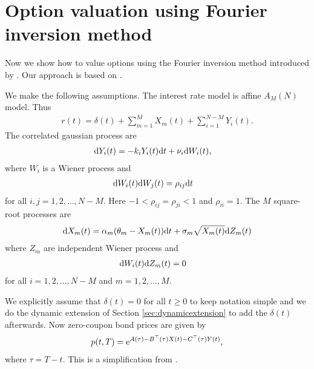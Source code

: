 \section{Option valuation using Fourier inversion method}
\label{chap:fourier}

Now we show how to value options using the Fourier inversion method introduced by \textcite{heston1993closed}. Our approach is based on \textcite[pp. 222--233]{nawalkabeliaevasoto2007dynamic}.

We make the following assumptions. The interest rate model is affine $A_M(N)$ model. Thus
	\begin{align}
		r(t) = \delta(t) + \sum_{m=1}^M X_m(t) + \sum_{i=1}^{N-M} Y_i(t) .
	\end{align}
The correlated gaussian process are
\begin{align}
\mathrm{d} Y_i(t) &= - k_i Y_i(t) \mathrm{d} t + \nu_i \mathrm{d} W_i (t),
\end{align}
where $W_i$ is a Wiener process and 
\begin{align}
\mathrm{d} W_i (t) \mathrm{d} W_j (t) &= \rho_{ij} \mathrm{d} t    
\end{align}
for all $i,j = 1,2, \ldots, N-M$. Here $-1 < \rho_{ij} = \rho_{ji} < 1$ and $\rho_{ii} = 1$. The $M$ square-root processes are
\begin{align}
\mathrm{d} X_m(t) = \alpha_m ( \theta_m - X_m(t) ) \mathrm{d} t + \sigma_m \sqrt{ X_m(t) } \mathrm{d} Z_m (t)
\end{align}
where $Z_m$ are independent Wiener process and
\begin{align}
\mathrm{d} W_i (t) \mathrm{d} Z_m (t) &= 0    
\end{align}
for all $i = 1,2, \ldots, N-M$ and $m = 1,2, \ldots, M$. 

We explicitly assume that $\delta(t) = 0$ for all $t \geq 0$ to keep notation simple and we do the dynamic extension of Section \ref{sec:dynamicextension} to add the $\delta(t)$ afterwards. Now zero-coupon bond prices are given by
	\begin{align}
		\label{fourierbondaffineassumption}
		p(t,T) = \mathrm{e}^{A(\tau) - B^{\top} (\tau) X(t) - C^{\top} (\tau) Y(t) } ,
	\end{align} 
where $\tau = T-t$. This is a simplification from \textcite[p. 433--435]{nawalkabeliaevasoto2007dynamic}.
	
